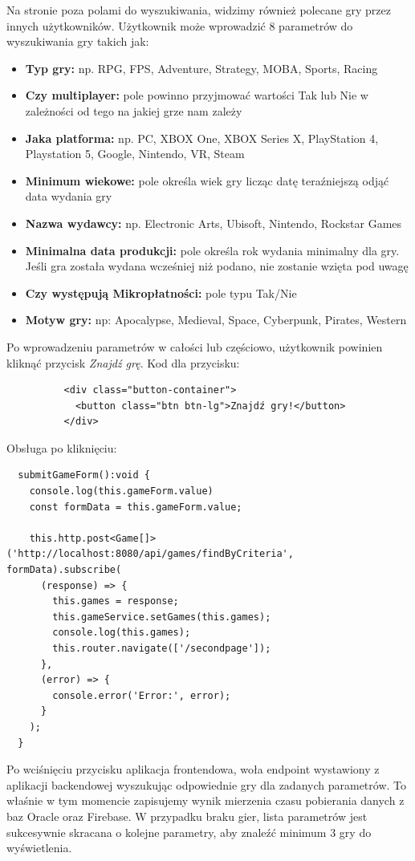 Na stronie poza polami do wyszukiwania, widzimy również polecane gry przez innych użytkowników. 
Użytkownik może wprowadzić 8 parametrów do wyszukiwania gry takich jak:
\begin{itemize}
\item \textbf{Typ gry:} np. RPG, FPS, Adventure, Strategy, MOBA, Sports, Racing
\item \textbf{Czy multiplayer:} pole powinno przyjmować wartości Tak lub Nie w zależności od tego na jakiej grze nam zależy
\item \textbf{Jaka platforma:} np. PC, XBOX One, XBOX Series X, PlayStation 4, Playstation 5, Google, Nintendo, VR, Steam
\item \textbf{Minimum wiekowe:} pole określa wiek gry licząc datę teraźniejszą odjąć data wydania gry
\item \textbf{Nazwa wydawcy:} np. Electronic Arts, Ubisoft, Nintendo, Rockstar Games
\item \textbf{Minimalna data produkcji:} pole określa rok wydania minimalny dla gry. Jeśli gra została wydana wcześniej niż podano, nie zostanie wzięta pod uwagę
\item \textbf{Czy występują Mikropłatności:} pole typu Tak/Nie
\item \textbf{Motyw gry:} np: Apocalypse, Medieval, Space, Cyberpunk, Pirates, Western
\end{itemize}
Po wprowadzeniu parametrów w całości lub częściowo, użytkownik powinien kliknąć przycisk \textit{Znajdź grę}.
Kod dla przycisku:
\begin{lstlisting}
          <div class="button-container">
            <button class="btn btn-lg">Znajdź gry!</button>
          </div>
\end{lstlisting}
Obsługa po kliknięciu:
\begin{lstlisting}
  submitGameForm():void {
    console.log(this.gameForm.value)
    const formData = this.gameForm.value;

    this.http.post<Game[]>('http://localhost:8080/api/games/findByCriteria', formData).subscribe(
      (response) => {
        this.games = response;
        this.gameService.setGames(this.games);
        console.log(this.games);
        this.router.navigate(['/secondpage']);
      },
      (error) => {
        console.error('Error:', error);
      }
    );
  }
\end{lstlisting}
Po wciśnięciu przycisku aplikacja frontendowa, woła endpoint wystawiony z aplikacji backendowej wyszukując odpowiednie gry dla zadanych parametrów. To właśnie w tym momencie zapisujemy wynik mierzenia czasu pobierania danych z baz Oracle oraz Firebase. W przypadku braku gier, lista parametrów jest sukcesywnie skracana o kolejne parametry, aby znaleźć minimum 3 gry do wyświetlenia.

